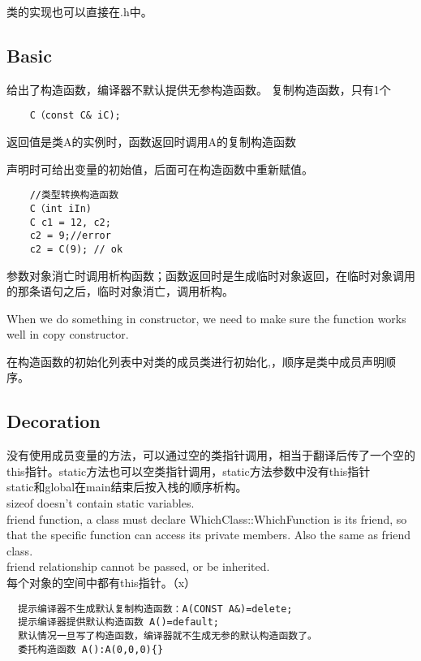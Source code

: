 \documentclass[UTF8]{article}
\begin{document}
类的实现也可以直接在.h中。
\subsection{Basic}
给出了构造函数，编译器不默认提供无参构造函数。
复制构造函数，只有1个
\begin{lstlisting}
    C（const C& iC);
\end{lstlisting}
返回值是类A的实例时，函数返回时调用A的复制构造函数

声明时可给出变量的初始值，后面可在构造函数中重新赋值。

\begin{lstlisting}
    //类型转换构造函数
    C（int iIn)
    C c1 = 12, c2;
    c2 = 9;//error
    c2 = C(9); // ok
\end{lstlisting}

参数对象消亡时调用析构函数；函数返回时是生成临时对象返回，在临时对象调用的那条语句之后，临时对象消亡，调用析构。

When we do something in constructor, we need to make sure the function works well in copy constructor.

在构造函数的初始化列表中对类的成员类进行初始化,，顺序是类中成员声明顺序。

\subsection{Decoration}
没有使用成员变量的方法，可以通过空的类指针调用，相当于翻译后传了一个空的this指针。static方法也可以空类指针调用，static方法参数中没有this指针 \\
static和global在main结束后按入栈的顺序析构。\\
sizeof doesn't contain static variables.\\
friend function, a class must declare WhichClass::WhichFunction is its friend, so that the specific function can access its private members. Also the same as friend class.\\
friend relationship cannot be passed, or be inherited.\\
每个对象的空间中都有this指针。（x）\\

\begin{lstlisting}
  提示编译器不生成默认复制构造函数：A(CONST A&)=delete;
  提示编译器提供默认构造函数 A()=default;
  默认情况一旦写了构造函数，编译器就不生成无参的默认构造函数了。
  委托构造函数 A():A(0,0,0){}
\end{lstlisting}
\end{document}
